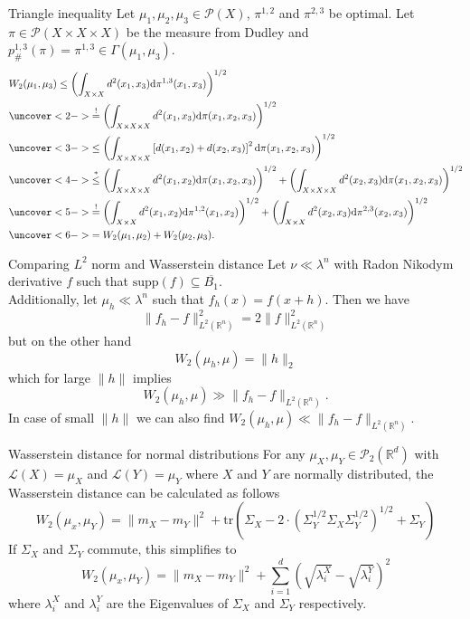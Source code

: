 \documentclass[10pt]{beamer}
\theoremstyle{reminder}
\begin{document}
\begin{frame}{Triangle inequality}
    Let $\mu_1,\mu_2,\mu_3 \in \mathcal{P}(X)$, $\pi^{1,2}$ and $\pi^{2,3}$ be optimal. 
    Let $\pi \in \mathcal{P}(X\times X\times X)$ be the measure from Dudley and $p^{1,3}_{\#}(\pi) = \pi^{1,3} \in \Gamma(\mu_1,\mu_3).$ 
    \begin{align*}&W_2(\mu_1,\mu_3) 
        \leq\left(\int_{X\times X}d^2(x_1,x_3)\mathrm{d}\pi^{1,3}(x_1,x_3)\right)^{1/2} 
        \\&\uncover<2->{\overset{!}{=}\left(\int_{X\times X\times X}d^2(x_1,x_3)\mathrm{d}\pi(x_1,x_2,x_3)\right)^{1/2}}
        \\&\uncover<3->{\leq \left(\int_{ X\times X\times X}\left[d(x_1,x_2)+d(x_2,x_3)\right]^2\mathrm{d}\pi(x_1,x_2,x_3)\right)^{1/2}}
        \\&\uncover<4->{\overset{*}{\leq}\left(\int_{X\times X \times X}d^2(x_1,x_2)\mathrm{d}\pi(x_1,x_2,x_3)\right)^{1/2}+\left(\int_{X\times X\times X}d^2(x_2,x_3)\mathrm{d}\pi(x_1,x_2,x_3)\right)^{1/2}}
        \\&\uncover<5->{\overset{!}{=}\left(\int_{X\times X}d^2(x_1,x_2)\mathrm{d}\pi^{1,2}(x_1,x_2)\right)^{1/2}+\left(\int_{X\times X}d^2(x_2,x_3)\mathrm{d}\pi^{2,3}(x_2,x_3)\right)^{1/2}}
        \\&\uncover<6->{=W_2(\mu_1,\mu_2)+W_2(\mu_2,\mu_3)}.
      \end{align*}
\end{frame}



\begin{frame}{Comparing $L^2$ norm and Wasserstein distance}
    Let $\nu \ll \lambda^n$ with Radon Nikodym derivative $f$ such that $\text{supp}(f) \subseteq \overline{B_1}$. \\ 
    \vspace{0.5cm}
        Additionally, let $\mu_h \ll \lambda^n$ such that $f_h(x) = f(x+h)$. Then we have $$\|f_h-f\|^2_{L^2(\mathbb{R}^n)} = 2\|f\|_{L^2(\mathbb{R}^n)}^2$$ but on the other hand $$W_2(\mu_h,\mu) = \|h\|_2$$ which for large $\|h\|$ implies $$W_2(\mu_h,\mu) \gg \|f_h-f\|_{L^2(\mathbb{R}^n)}.$$ In case of small $\|h\|$ we can also find $W_2(\mu_h,\mu) \ll \|f_h-f\|_{L^2(\mathbb{R}^n)}$.
\end{frame}

\begin{frame}{Wasserstein distance for normal distributions}
    For any $\mu_X,\mu_Y \in \mathcal{P}_2(\mathbb{R}^d)$ with $\mathcal{L}(X) = \mu_X$ and $\mathcal{L}(Y) = \mu_Y$ where $X$ and $Y$ are normally distributed, 
    the Wasserstein distance can be calculated as follows $$W_2(\mu_x,\mu_Y) = \|m_X-m_Y\|^2 + \text{tr}\left(\Sigma_X-2 \cdot \left(\Sigma_Y^{1/2}\Sigma_X\Sigma_Y^{1/2}\right)^{1/2}+\Sigma_Y\right)$$
    If $\Sigma_X$ and $\Sigma_Y$ commute, this simplifies to $$W_2(\mu_x,\mu_Y) = \|m_X-m_Y\|^2 + \sum_{i = 1}^d \left( \sqrt{\lambda_i^X} - \sqrt{\lambda_i^Y}  \right)^2$$
    where $\lambda_i^X$ and $\lambda_i^Y$ are the Eigenvalues of $\Sigma_X$ and $\Sigma_Y$ respectively. 
\end{frame}
\end{document}
